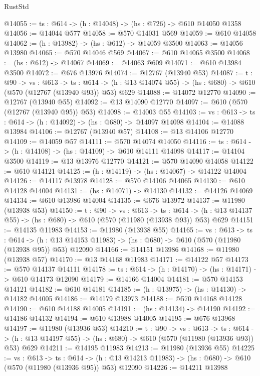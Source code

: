 \begin{lexlean}{RustStd}
\begin{coremodule}
@14055 := {ts : @614} -> (h : @14048) -> (hs : @726) -> @610 @14050 @1358
@14056 := @14044 @577
@14058 := @570 @14031 @569
@14059 := @610 @14058
@14062 := (h : @13982) -> (hs : @612) -> @14059 @3500
@14063 := @14056 @13980
@14065 := @570 @14046 @569
@14067 := @610 @14065 @3500
@14068 := (hs : @612) -> @14067
@14069 := @14063 @609
@14071 := @610 @13984 @3500
@14072 := @676 @13976
@14074 := @12767 (@13940 @53)
@14087 := {t : @90} ->
  {vs : @613} ->
  {ts : @614} -> (h : @13 @14074 @55) -> (hs : @680) -> @610 (@570 (@12767 (@13940 @93)) @53) @629
@14088 := @14072 @12770
@14090 := @12767 (@13940 @55)
@14092 := @13 @14090 @12770
@14097 := @610 (@570 (@12767 (@13940 @95)) @53)
@14098 := @14003 @55
@14103 := {vs : @613} -> {ts : @614} -> (h : @14092) -> (hs : @680) -> @14097 @14098
@14104 := @14088 @13984
@14106 := @12767 (@13940 @57)
@14108 := @13 @14106 @12770
@14109 := @14059 @57
@14111 := @570 @14074 @14050
@14116 := {ts : @614} -> (h : @14108) -> (hs : @14109) -> @610 @14111 @14098
@14117 := @14104 @3500
@14119 := @13 @13976 @12770
@14121 := @570 @14090 @14058
@14122 := @610 @14121
@14125 := (h : @14119) -> (hs : @14067) -> @14122 @14004
@14126 := @14117 @13978
@14128 := @570 @14106 @14065
@14130 := @610 @14128 @14004
@14131 := (hs : @14071) -> @14130
@14132 := @14126 @14069
@14134 := @610 @13986 @14004
@14135 := @676 @13972
@14137 := @11980 (@13938 @53)
@14150 := {t : @90} ->
  {vs : @613} ->
  {ts : @614} -> (h : @13 @14137 @55) -> (hs : @680) -> @610 (@570 (@11980 (@13938 @93)) @53) @629
@14151 := @14135 @11983
@14153 := @11980 (@13938 @55)
@14165 := {vs : @613} ->
  {ts : @614} ->
  (h : @13 @14153 @11983) -> (hs : @680) -> @610 (@570 (@11980 (@13938 @95)) @53) @12090
@14166 := @14151 @13986
@14168 := @11980 (@13938 @57)
@14170 := @13 @14168 @11983
@14171 := @14122 @57
@14173 := @570 @14137 @14111
@14178 := {ts : @614} -> (h : @14170) -> (hs : @14171) -> @610 @14173 @12090
@14179 := @14166 @14004
@14181 := @570 @14153 @14121
@14182 := @610 @14181
@14185 := (h : @13975) -> (hs : @14130) -> @14182 @14005
@14186 := @14179 @13973
@14188 := @570 @14168 @14128
@14190 := @610 @14188 @14005
@14191 := (hs : @14134) -> @14190
@14192 := @14186 @14132
@14194 := @610 @13988 @14005
@14195 := @676 @13968
@14197 := @11980 (@13936 @53)
@14210 := {t : @90} ->
  {vs : @613} ->
  {ts : @614} -> (h : @13 @14197 @55) -> (hs : @680) -> @610 (@570 (@11980 (@13936 @93)) @53) @629
@14211 := @14195 @11983
@14213 := @11980 (@13936 @55)
@14225 := {vs : @613} ->
  {ts : @614} ->
  (h : @13 @14213 @11983) -> (hs : @680) -> @610 (@570 (@11980 (@13936 @95)) @53) @12090
@14226 := @14211 @13988

\end{coremodule}
\end{lexlean}

